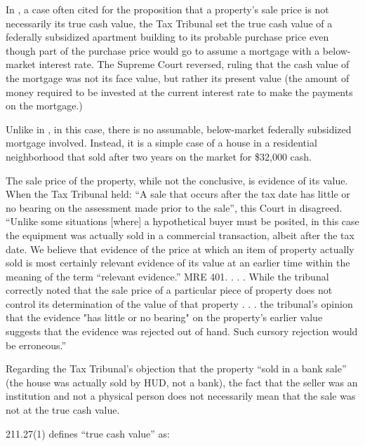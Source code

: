 \documentclass[12pt,\documentclassflag]{michiganCourtOfAppealsBrief}
\begin{document}
In \cite{Antisdale}, a case often cited for the proposition that a property's sale price is not necessarily its true cash value, the Tax Tribunal set the true cash value of a federally subsidized apartment building to its probable purchase price even though part of the purchase price would go to assume a mortgage with a below-market interest rate. The Supreme Court reversed, ruling that the cash value of the mortgage was not its face value, but rather its present value (the amount of money required to be invested at the current interest rate to make the payments on the mortgage.)

Unlike in \cite[s]{Antisdale}, in this case, there is no assumable, below-market federally subsidized mortgage involved. Instead, it is a simple case of a house in a residential neighborhood that sold after two years on the market for \$32,000 cash.

The sale price of the property, while not the conclusive, is evidence of its value. When the Tax Tribunal held: ``A sale that occurs after the tax date has little or no bearing on the assessment made prior to the sale'', this Court in  disagreed. ``Unlike some situations [where] a hypothetical buyer must be posited, in this case the equipment was actually sold in a commercial transaction, albeit after the tax date. We believe that evidence of the price at which an item of property actually sold is most certainly relevant evidence of its value at an earlier time within the meaning of the term ``relevant evidence.'' MRE 401. . . . While the tribunal correctly noted that the sale price of a particular piece of property does not control its determination of the value of that property . . . the tribunal's opinion that the evidence "has little or no bearing" on the property's earlier value suggests that the evidence was rejected out of hand. Such cursory rejection would be erroneous.''

Regarding the Tax Tribunal's objection that the property ``sold in a bank sale'' (the house was actually sold by HUD, not a bank), the fact that the seller was an institution and not a physical person does not necessarily mean that the sale was not at the true cash value.

\cite{MCL}{211.27(1)} defines ``true cash value'' as:
\end{document}
